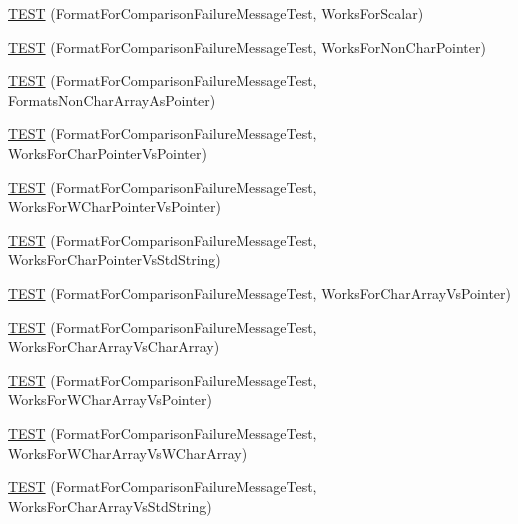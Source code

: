 \begin{DoxyCompactItemize}
\item 
\mbox{\hyperlink{namespacetesting_1_1gtest__printers__test_aa7429c3701e464d0047a82686a5e8a46}{T\+E\+ST}} (Format\+For\+Comparison\+Failure\+Message\+Test, Works\+For\+Scalar)
\item 
\mbox{\hyperlink{namespacetesting_1_1gtest__printers__test_adb093d9323bfb766be8c91215c46056e}{T\+E\+ST}} (Format\+For\+Comparison\+Failure\+Message\+Test, Works\+For\+Non\+Char\+Pointer)
\item 
\mbox{\hyperlink{namespacetesting_1_1gtest__printers__test_a3571808f93f419268b6aed1aa127ea30}{T\+E\+ST}} (Format\+For\+Comparison\+Failure\+Message\+Test, Formats\+Non\+Char\+Array\+As\+Pointer)
\item 
\mbox{\hyperlink{namespacetesting_1_1gtest__printers__test_a1694d4063da702f5379495d3cb2cbc91}{T\+E\+ST}} (Format\+For\+Comparison\+Failure\+Message\+Test, Works\+For\+Char\+Pointer\+Vs\+Pointer)
\item 
\mbox{\hyperlink{namespacetesting_1_1gtest__printers__test_a735171f4ba0a9dffee9c4c7321107822}{T\+E\+ST}} (Format\+For\+Comparison\+Failure\+Message\+Test, Works\+For\+W\+Char\+Pointer\+Vs\+Pointer)
\item 
\mbox{\hyperlink{namespacetesting_1_1gtest__printers__test_ab5a910170489276c14b817b70d4feb96}{T\+E\+ST}} (Format\+For\+Comparison\+Failure\+Message\+Test, Works\+For\+Char\+Pointer\+Vs\+Std\+String)
\item 
\mbox{\hyperlink{namespacetesting_1_1gtest__printers__test_ac25834e0463cf9f3d231db24e7b220e5}{T\+E\+ST}} (Format\+For\+Comparison\+Failure\+Message\+Test, Works\+For\+Char\+Array\+Vs\+Pointer)
\item 
\mbox{\hyperlink{namespacetesting_1_1gtest__printers__test_aba32640344f0186de5fbb6bb47e0c5a5}{T\+E\+ST}} (Format\+For\+Comparison\+Failure\+Message\+Test, Works\+For\+Char\+Array\+Vs\+Char\+Array)
\item 
\mbox{\hyperlink{namespacetesting_1_1gtest__printers__test_a1e95289500400eff5fdcd45c5864a6d2}{T\+E\+ST}} (Format\+For\+Comparison\+Failure\+Message\+Test, Works\+For\+W\+Char\+Array\+Vs\+Pointer)
\item 
\mbox{\hyperlink{namespacetesting_1_1gtest__printers__test_af4b502fb5745d2ee0bfb81d1c8eb95f6}{T\+E\+ST}} (Format\+For\+Comparison\+Failure\+Message\+Test, Works\+For\+W\+Char\+Array\+Vs\+W\+Char\+Array)
\item 
\mbox{\hyperlink{namespacetesting_1_1gtest__printers__test_ac2300073f401f783ff7b1ef97d2cbd6d}{T\+E\+ST}} (Format\+For\+Comparison\+Failure\+Message\+Test, Works\+For\+Char\+Array\+Vs\+Std\+String)

\end{DoxyCompactItemize}
